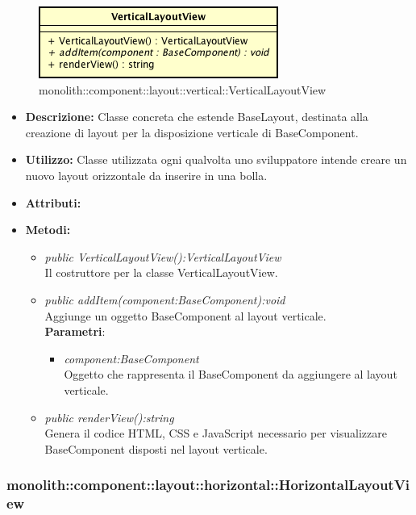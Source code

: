 \label{monolith::component::layout::vertical::VerticalLayoutView}
\begin{figure}[ht]
	\centering
	\includegraphics[scale=0.5]{Sezioni/SottosezioniST/img/VerticalLayoutView.png}
	\caption{monolith::component::layout::vertical::VerticalLayoutView}
\end{figure}

\begin{itemize}
\item \textbf{Descrizione:} Classe concreta che estende BaseLayout, destinata alla creazione di layout per la disposizione verticale di BaseComponent.
\item \textbf{Utilizzo:} Classe utilizzata ogni qualvolta uno sviluppatore intende creare un nuovo layout orizzontale da inserire in una bolla.
\item \textbf{Attributi:}
\item \textbf{Metodi:}
\begin{itemize}
\item\textit{public VerticalLayoutView():VerticalLayoutView}\\
Il costruttore per la classe VerticalLayoutView.
\item \textit{public addItem(component:BaseComponent):void}\\
Aggiunge un oggetto BaseComponent al layout verticale.
\\ \textbf{Parametri}: \begin{itemize}
\item \textit{component:BaseComponent}\\
Oggetto che rappresenta il BaseComponent da aggiungere al layout verticale.
\end{itemize}
\item \textit{public renderView():string}\\
Genera il codice HTML, CSS e JavaScript necessario per visualizzare BaseComponent disposti nel layout verticale.
\end{itemize}
\end{itemize}

\subsubsection{monolith::component::layout::horizontal::HorizontalLayoutView}

